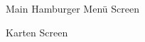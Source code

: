 \documentclass[
    DIV12,
    cleardouble=plain,
    headings=normal,
    pdftex,
    headexclude,footexclude,
    final
]{scrreprt}
\begin{document}
\begin{figure}[ht]
	\centering
	\caption{Main Hamburger Menü Screen}
	\label{fig1}
\end{figure}



\begin{figure}[ht]
	\centering
	\caption{Karten Screen}
	\label{fig1}
\end{figure}
\end{document}
